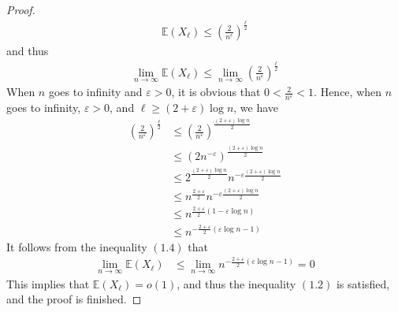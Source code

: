 \begin{proof}
\begin{align*}
    \mathbb{E}(X_{\ell}) \leq \left( \frac{2}{n^{\epsilon}} \right)^{\frac{\ell}{2}}
  \end{align*}
  and thus
  \begin{align*}
    \lim\limits_{n \to \infty} \mathbb{E}(X_{\ell}) \leq \lim\limits_{n \to \infty} \left( \frac{2}{n^{\epsilon}} \right)^{\frac{\ell}{2}} \tag{1.4}
  \end{align*}
  When $n$ goes to infinity and $\varepsilon > 0$, it is obvious that $0 < \frac{2}{n^{\varepsilon}} < 1$. Hence, when $n$ goes to infinity, $\varepsilon > 0$, and $\ell \geq (2+\varepsilon) \log n$, we have
  \begin{align*}
    \left( \frac{2}{n^{\varepsilon}} \right)^{\frac{\ell}{2}} &\leq \left( \frac{2}{n^{\varepsilon}} \right)^{\frac{(2+\varepsilon) \log n}{2}} \\
                                                           &\leq \left( 2n^{-\varepsilon} \right)^{\frac{(2+\varepsilon) \log n}{2}} \\
                                                           &\leq 2^{\frac{(2+\varepsilon) \log n}{2}} n^{-\varepsilon \frac{(2+\varepsilon) \log n}{2}} \\
                                                           &\leq n^{\frac{2+\varepsilon}{2}} n^{-\varepsilon \frac{(2+\varepsilon) \log n}{2}} \\
                                                           &\leq n^{\frac{2+\varepsilon}{2} (1 - \varepsilon \log n)} \\
                                                           &\leq n^{-\frac{2+\varepsilon}{2} (\varepsilon \log n - 1)}
  \end{align*}
  It follows from the inequality $(1.4)$ that 
  \begin{align*}
    \lim\limits_{n \to \infty} \mathbb{E}(X_{\ell}) &\leq \lim\limits_{n \to \infty} n^{-\frac{2+\varepsilon}{2} (\varepsilon \log n - 1)} = 0
  \end{align*}
  This implies that $\mathbb{E}(X_{\ell}) = o(1)$, and thus the inequality $(1.2)$ is satisfied, and the proof is finished.
  

\end{proof}

